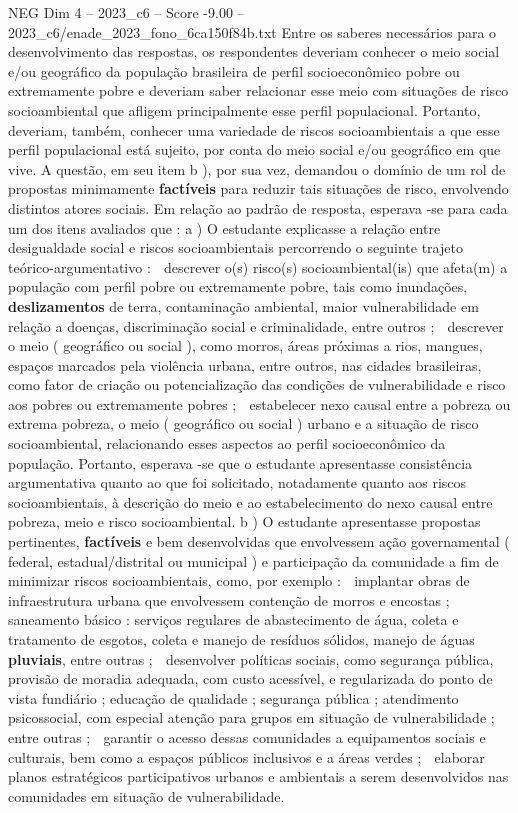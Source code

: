 \begin{textsample}{NEG Dim 4 – 2023\_c6 – Score -9.00 – 2023\_c6/enade\_2023\_fono\_6ca150f84b.txt}
Entre os saberes necessários para o desenvolvimento das respostas, os respondentes deveriam conhecer o meio social e/ou geográfico da população brasileira de perfil socioeconômico pobre ou extremamente pobre e deveriam saber relacionar esse meio com situações de risco socioambiental que afligem principalmente esse perfil populacional.
Portanto, deveriam, também, conhecer uma variedade de riscos socioambientais a que esse perfil populacional está sujeito, por conta do meio social e/ou geográfico em que vive.
A questão, em seu item b ), por sua vez, demandou o domínio de um rol de propostas minimamente \textbf{factíveis} para reduzir tais situações de risco, envolvendo distintos atores sociais.
Em relação ao padrão de resposta, esperava -se para cada um dos itens avaliados que : a ) O estudante explicasse a relação entre desigualdade social e riscos socioambientais percorrendo o seguinte trajeto teórico-argumentativo :  descrever o(s) risco(s) socioambiental(is) que afeta(m) a população com perfil pobre ou extremamente pobre, tais como inundações, \textbf{deslizamentos} de terra, contaminação ambiental, maior vulnerabilidade em relação a doenças, discriminação social e criminalidade, entre outros ;  descrever o meio ( geográfico ou social ), como morros, áreas próximas a rios, mangues, espaços marcados pela violência urbana, entre outros, nas cidades brasileiras, como fator de criação ou potencialização das condições de vulnerabilidade e risco aos pobres ou extremamente pobres ;  estabelecer nexo causal entre a pobreza ou extrema pobreza, o meio ( geográfico ou social ) urbano e a situação de risco socioambiental, relacionando esses aspectos ao perfil socioeconômico da população.
Portanto, esperava -se que o estudante apresentasse consistência argumentativa quanto ao que foi solicitado, notadamente quanto aos riscos socioambientais, à descrição do meio e ao estabelecimento do nexo causal entre pobreza, meio e risco socioambiental. b ) O estudante apresentasse propostas pertinentes, \textbf{factíveis} e bem desenvolvidas que envolvessem ação governamental ( federal, estadual/distrital ou municipal ) e participação da comunidade a fim de minimizar riscos socioambientais, como, por exemplo :  implantar obras de infraestrutura urbana que envolvessem contenção de morros e encostas ; saneamento básico : serviços regulares de abastecimento de água, coleta e tratamento de esgotos, coleta e manejo de resíduos sólidos, manejo de águas \textbf{pluviais}, entre outras ;  desenvolver políticas sociais, como segurança pública, provisão de moradia adequada, com custo acessível, e regularizada do ponto de vista fundiário ; educação de qualidade ; segurança pública ; atendimento psicossocial, com especial atenção para grupos em situação de vulnerabilidade ; entre outras ;  garantir o acesso dessas comunidades a equipamentos sociais e culturais, bem como a espaços públicos inclusivos e a áreas verdes ;  elaborar planos estratégicos participativos urbanos e ambientais a serem desenvolvidos nas comunidades em situação de vulnerabilidade.

\end{textsample}
